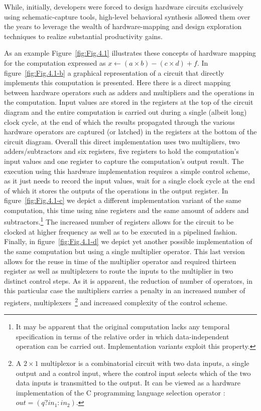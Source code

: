 While, initially, developers were forced to design hardware circuits exclusively using schematic-capture tools, high-level behavioral synthesis allowed them over the years to leverage the wealth of hardware-mapping and design exploration techniques to realize substantial productivity gains. 

As an example Figure~\ref{fig:Fig.4.1} illustrates these concepts of hardware mapping for the computation expressed as $x \gets (a \times b) - (c \times d) + f$. 
In figure~\ref{fig:Fig.4.1-b} a graphical representation of a circuit that directly implements this computation is presented. 
Here there is a direct mapping between hardware operators such as adders and multipliers and the operations in the computation. 
Input values are stored in the registers at the top of the circuit diagram and the entire computation is carried out during a single (albeit long) clock cycle, at the end of which the results propagated through the various hardware operators are captured (or latched) in the registers at the bottom of the circuit diagram. 
Overall this direct implementation uses two multipliers, two adders/subtractors and six registers, five registers to hold the computation's input values and one register to capture the computation's output result.
The execution using this hardware implementation  requires a simple control scheme, as it just needs to record the input values, wait for a single clock cycle at the end of which it stores the outputs of the operations in the output register. 
In figure~\ref{fig:Fig.4.1-c} we depict a different implementation variant of the same computation, this time using nine registers and the same amount of adders and subtractors.\footnote{It may be apparent that the original computation lacks any temporal specification in terms of the relative order in which data-independent operation can be carried out. Implementation variants exploit this property.} 
The increased number of registers allows for the circuit to be clocked at higher frequency as well as to be executed in a pipelined fashion. 
Finally, in figure~\ref{fig:Fig.4.1-d} we depict yet another possible implementation of the same computation but using a single multiplier operator. 
This last version allows for the reuse in time of the multiplier operator and required thirteen register as well as multiplexers to route the inputs to the multiplier in two distinct control steps. 
As it is apparent, the reduction of number of operators, in this particular case the multipliers carries a penalty in an increased number of registers, multiplexers~\footnote{A $2\times1$ multiplexor is a combinatorial circuit with two data inputs, a single output and a control input, where the control input selects which of the two data inputs is transmitted to the output. 
  It can be viewed as a hardware implementation of the C programming language selection operator : 
  $\textit{out} = (q ? 
    \textit{in}_1 : 
    \textit{in}_2)$.} 
and increased complexity of the control scheme.\\

